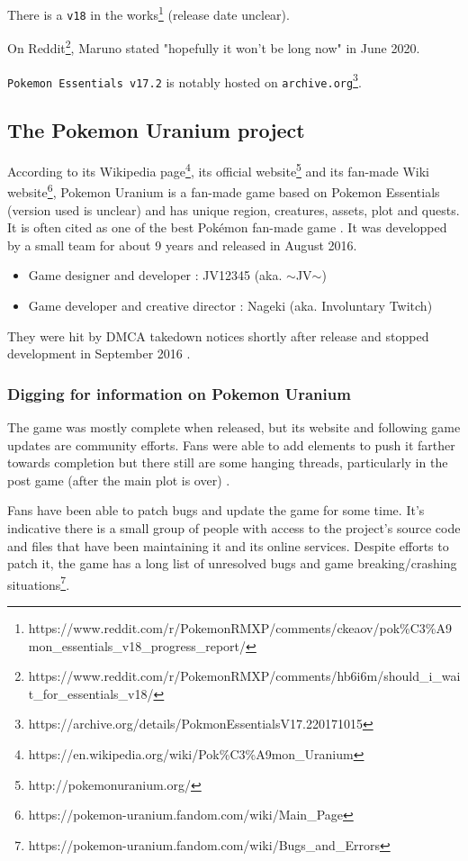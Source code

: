 \documentclass[11pt]{article}
\begin{document}
There is a \texttt{v18} in the works\footnote{https://www.reddit.com/r/PokemonRMXP/comments/ckeaov/pok\%C3\%A9mon\_essentials\_v18\_progress\_report/} (release date unclear). {On Reddit\footnote{https://www.reddit.com/r/PokemonRMXP/comments/hb6i6m/should\_i\_wait\_for\_essentials\_v18/}, Maruno stated "hopefully it won't be long now" in June 2020.

\texttt{Pokemon Essentials v17.2} is notably hosted on \texttt{archive.org}\footnote{https://archive.org/details/PokmonEssentialsV17.220171015}.





\subsection{The Pokemon Uranium project}


According to its Wikipedia page\footnote{https://en.wikipedia.org/wiki/Pok\%C3\%A9mon\_Uranium}, its official website\footnote{http://pokemonuranium.org/} and its fan-made Wiki website\footnote{https://pokemon-uranium.fandom.com/wiki/Main\_Page}, Pokemon Uranium is a fan-made game based on Pokemon Essentials (version used is unclear) and has unique region, creatures, assets, plot and quests. It is often cited as one of the best Pokémon fan-made game \cite{PkmnBestFG, PkmnBestFG2}.
It was developped by a small team for about 9 years and released in August 2016.
\begin{itemize}
	\item Game designer and developer : JV12345 (aka. $\sim$JV$\sim$)
	\item Game developer and creative director : Nageki (aka. Involuntary Twitch)
\end{itemize}
They were hit by DMCA takedown notices shortly after release and stopped development in September 2016 \cite{PUtakedown}.


\subsubsection{Digging for information on Pokemon Uranium}

The game was mostly complete when released, but its website and following game updates are community efforts. Fans were able to add elements to push it farther towards completion but there still are some hanging threads, particularly in the post game (after the main plot is over) \cite{PUsidequests}.

Fans have been able to patch bugs and update the game for some time. It's indicative there is a small group of people with access to the project's source code and files that have been maintaining it and its online services. Despite efforts to patch it, the game has a long list of unresolved bugs and game breaking/crashing situations\footnote{https://pokemon-uranium.fandom.com/wiki/Bugs\_and\_Errors}.
	
}
\end{document}
